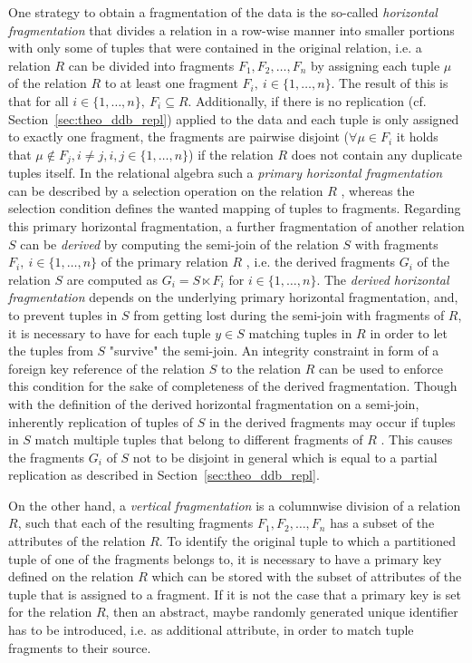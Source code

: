 One strategy to obtain a fragmentation of the data is the so-called \emph{horizontal fragmentation} \cite[p.~105]{Ozsu1991} that divides a relation in a 
row-wise manner into smaller portions with only some of tuples that were contained in the original relation, i.e. a relation $R$ can be divided into 
fragments $F_1, F_2,\dots, F_n$ by assigning each tuple $\mu$ of the relation $R$ to at least one fragment $F_i,~i\in\{1,\dots,n\}$. The result of this is
that for all $i\in\{1,\dots,n\},~F_i \subseteq R$. Additionally, if there is no replication (cf. Section~\ref{sec:theo_ddb_repl}) applied to the data and
each tuple is only assigned to exactly one fragment, the fragments are pairwise disjoint ($\forall \mu \in F_i$ it holds that 
$\mu \notin F_j, i\neq j, i,j\in\{1,\dots,n\}$) if the relation $R$ does not contain any duplicate tuples itself. In the relational algebra such a
\emph{primary horizontal fragmentation} can be described by a selection operation on the relation $R$ \cite[p.~109]{Ozsu1991}, whereas the selection 
condition defines the wanted mapping of tuples to fragments. Regarding this primary horizontal fragmentation, a further fragmentation of another relation
$S$ can be \emph{derived} by computing the semi-join of the relation $S$ with fragments $F_i,~i\in\{1,\dots,n\}$ of the primary relation $R$
\cite[p.~116f.]{Ozsu1991}, i.e. the derived fragments $G_i$ of the relation $S$ are computed as $G_i=S \ltimes F_i$ for $i\in\{1,\dots,n\}$.
The \emph{derived horizontal fragmentation} depends on the underlying primary horizontal fragmentation, and, to prevent tuples in $S$ from getting lost
during the semi-join with fragments of $R$, it is necessary to have for each tuple $y\in S$ matching tuples in $R$ in order to let the tuples from $S$ 
"survive" the semi-join. An integrity constraint in form of a foreign key reference of the relation $S$ to the relation $R$ can be used to enforce this
condition for the sake of completeness of the derived fragmentation. Though with the definition of the derived horizontal fragmentation on a semi-join,
inherently replication of tuples of $S$ in the derived fragments may occur if tuples in $S$ match multiple tuples that belong to different fragments of 
$R$ \cite[p.~121]{Ozsu1991}. This causes the fragments $G_i$ of $S$ not to be disjoint in general which is equal to a partial replication as described 
in Section~\ref{sec:theo_ddb_repl}.


On the other hand, a \emph{vertical fragmentation} \cite[p.~122]{Ozsu1991} is a columnwise division of a relation $R$, such that each of the resulting
fragments $F_1,F_2,\dots,F_n$ has a subset of the attributes of the relation $R$. To identify the original tuple to which a partitioned tuple of one of 
the fragments belongs to, it is necessary to have a primary key defined on the relation $R$ which can be stored with the subset of attributes of the 
tuple that is assigned to a fragment. If it is not the case that a primary key is set for the relation $R$, then an abstract, maybe randomly generated
unique identifier has to be introduced, i.e. as additional attribute, in order to match tuple fragments to their source. 

